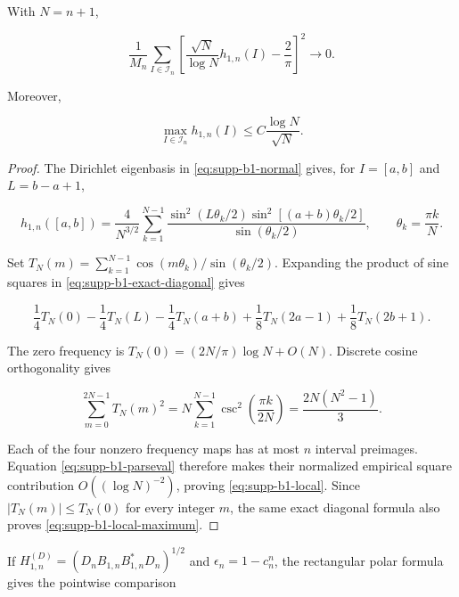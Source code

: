 \begin{lemma}
\label{lem:supp-b1-local}
With \(N=n+1\),

\begin{equation}\label{eq:supp-b1-local}
 \frac1{M_n}\sum_{I\in\mathcal I_n}
 \left[\frac{\sqrt N}{\log N}h_{1,n}(I)-\frac2\pi\right]^2
 \longrightarrow0.
\end{equation}

Moreover,

\begin{equation}\label{eq:supp-b1-local-maximum}
 \max_{I\in\mathcal I_n}h_{1,n}(I)
 \le C\frac{\log N}{\sqrt N}.
\end{equation}
\end{lemma}

\begin{proof}
The Dirichlet eigenbasis in \eqref{eq:supp-b1-normal} gives, for
\(I=[a,b]\) and \(L=b-a+1\),

\begin{equation}\label{eq:supp-b1-exact-diagonal}
 h_{1,n}([a,b])=\frac4{N^{3/2}}\sum_{k=1}^{N-1}
 \frac{\sin^2(L\theta_k/2)\sin^2[(a+b)\theta_k/2]}
 {\sin(\theta_k/2)},
 \qquad \theta_k=\frac{\pi k}{N}.
\end{equation}

Set
\(T_N(m)=\sum_{k=1}^{N-1}\cos(m\theta_k)/\sin(\theta_k/2)\).
Expanding the product of sine squares in
\eqref{eq:supp-b1-exact-diagonal} gives

\[
 \frac14T_N(0)-\frac14T_N(L)-\frac14T_N(a+b)
 +\frac18T_N(2a-1)+\frac18T_N(2b+1).
\]

The zero frequency is
\(T_N(0)=(2N/\pi)\log N+O(N)\).  Discrete cosine orthogonality gives

\begin{equation}\label{eq:supp-b1-parseval}
 \sum_{m=0}^{2N-1}T_N(m)^2
 =N\sum_{k=1}^{N-1}\csc^2\!\left(\frac{\pi k}{2N}\right)
 =\frac{2N(N^2-1)}3.
\end{equation}

Each of the four nonzero frequency maps has at most \(n\) interval
preimages.  Equation \eqref{eq:supp-b1-parseval} therefore makes their
normalized empirical square contribution \(O((\log N)^{-2})\), proving
\eqref{eq:supp-b1-local}.  Since
\(\lvert T_N(m)\rvert\le T_N(0)\) for every integer \(m\), the same exact
diagonal formula also proves \eqref{eq:supp-b1-local-maximum}.
\end{proof}

If \(H_{1,n}^{(D)}=(D_nB_{1,n}B_{1,n}^*D_n)^{1/2}\) and
\(\epsilon_n=1-c_n^n\), the rectangular polar formula gives the pointwise
comparison

